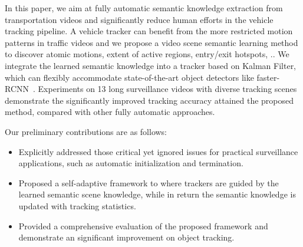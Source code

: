 In this paper, we aim at fully automatic semantic knowledge extraction from transportation videos and
significantly reduce human efforts in the vehicle tracking pipeline.
A vehicle tracker can benefit from the more restricted motion patterns in traffic videos and we 
propose a video scene semantic learning method to discover atomic motions, extent of active regions,
entry/exit hotspots, \etc..
We integrate the learned semantic knowledge into a tracker based on Kalman Filter,
which can flexibly accommodate state-of-the-art object detectors like faster-RCNN~\cite{renNIPS15fasterrcnn}.
Experiments on 13 long surveillance videos with diverse tracking scenes demonstrate the significantly improved tracking accuracy attained the proposed method, compared with other fully automatic approaches.


Our preliminary contributions are as follows:
\begin{itemize}%
    \item Explicitly addressed those critical yet ignored issues for practical surveillance applications, such as automatic initialization and termination.
    \item Proposed a self-adaptive framework to where trackers are guided by the learned semantic scene knowledge, while in return the semantic knowledge is updated with tracking statistics.
    \item Provided a comprehensive evaluation of the proposed framework and demonstrate an significant improvement on object tracking.
\end{itemize}


